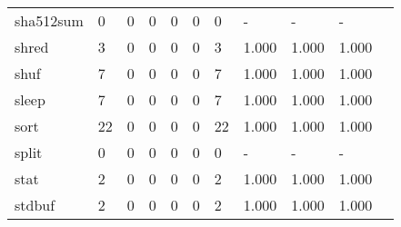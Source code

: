 \begin{longtable}{lp{1.10cm}p{1.10cm}p{1.10cm}p{1.10cm}p{1.10cm}p{1.10cm}p{1.10cm}p{1.10cm}p{1.10cm}p{1.10cm}}
sha512sum &                      0 &                                  0 &                                 0 &                                0 &                                 0 &                               0 &                              - &                                     - &                                   - \\
shred     &                      3 &                                  0 &                                 0 &                                0 &                                 0 &                               3 &                          1.000 &                                 1.000 &                               1.000 \\
shuf      &                      7 &                                  0 &                                 0 &                                0 &                                 0 &                               7 &                          1.000 &                                 1.000 &                               1.000 \\
sleep     &                      7 &                                  0 &                                 0 &                                0 &                                 0 &                               7 &                          1.000 &                                 1.000 &                               1.000 \\
sort      &                     22 &                                  0 &                                 0 &                                0 &                                 0 &                              22 &                          1.000 &                                 1.000 &                               1.000 \\
split     &                      0 &                                  0 &                                 0 &                                0 &                                 0 &                               0 &                              - &                                     - &                                   - \\
stat      &                      2 &                                  0 &                                 0 &                                0 &                                 0 &                               2 &                          1.000 &                                 1.000 &                               1.000 \\
stdbuf    &                      2 &                                  0 &                                 0 &                                0 &                                 0 &                               2 &                          1.000 &                                 1.000 &                               1.000 \\

\end{longtable}
